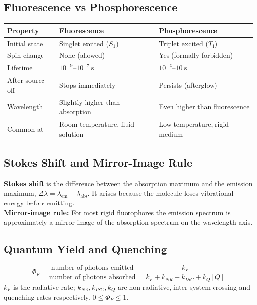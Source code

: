 \documentclass[12pt,a4paper]{article}
\begin{document}
\subsection{Fluorescence vs Phosphorescence}
\begin{tabularx}{\linewidth}{|B{3.0cm}|Y|Y|}
\hline
\textbf{Property} & \textbf{Fluorescence} & \textbf{Phosphorescence} \\
\hline
Initial state & Singlet excited ($S_1$) & Triplet excited ($T_1$) \\
\hline
Spin change & None (allowed) & Yes (formally forbidden) \\
\hline
Lifetime & $10^{-9}$--$10^{-7}\ \mathrm{s}$ & $10^{-3}$--$10\ \mathrm{s}$ \\
\hline
After source off & Stops immediately & Persists (afterglow) \\
\hline
Wavelength & Slightly higher than absorption & Even higher than fluorescence \\
\hline
Common at & Room temperature, fluid solution & Low temperature, rigid medium \\
\hline
\end{tabularx}

\subsection{Stokes Shift and Mirror-Image Rule}
\begin{tcolorbox}[defbox]
\textbf{Stokes shift} is the difference between the absorption maximum and the emission maximum, $\Delta\lambda=\lambda_{\mathrm{em}}-\lambda_{\mathrm{abs}}$. It arises because the molecule loses vibrational energy before emitting.\\
\textbf{Mirror-image rule:} For most rigid fluorophores the emission spectrum is approximately a mirror image of the absorption spectrum on the wavelength axis.
\end{tcolorbox}

\subsection{Quantum Yield and Quenching}
\begin{tcolorbox}[formulabox, title={Quantum Yield of Fluorescence}]
\[
\Phi_F=\frac{\text{number of photons emitted}}{\text{number of photons absorbed}}=\frac{k_F}{k_F+k_{NR}+k_{ISC}+k_Q[Q]}
\]
$k_F$ is the radiative rate; $k_{NR}, k_{ISC}, k_Q$ are non-radiative, inter-system crossing and quenching rates respectively. $0\le \Phi_F\le 1$.
\end{tcolorbox}
\end{document}
